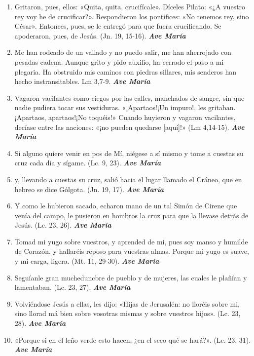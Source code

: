 \documentclass[a4paper,11pt, oneside]{report}
\begin{document}
\begin{enumerate}
  
  \item Gritaron, pues, ellos: «Quita, quita, crucifícale». Díceles Pilato: «¿A vuestro rey voy he de crucificar?». Respondieron los pontífices: «No tenemos rey,
  sino César». Entonces, pues, se le entregó para que fuera crucificando. Se apoderaron, pues, de Jesús. (Jn. 19, 15-16). \textbf{\textit{Ave María}}

  \item Me han rodeado de un vallado y no puedo salir, me han aherrojado con pesadas cadena. Aunque grito y pido auxilio, ha cerrado el paso
  a mi plegaria. Ha obstruido mis caminos con piedras sillares, mis senderos han hecho instransitables. Lm 3,7-9. \textbf{\textit{Ave María}}

  \item Vagaron vacilantes como ciegos por las calles, manchados de sangre, sin que nadie pudiera tocar sus vestiduras. «¡Apartaos!¡Un impuro!,
  les gritaban. ¡Apartaos, apartaos!¡No toquéis!» Cuando huyieron y vagaron vacilantes, decíase entre las naciones: «¡no pueden quedarse [aquí]!» 
  (Lm 4,14-15). \textbf{\textit{Ave María}}

  \item Si alguno quiere venir en pos de Mí, niégese a sí mismo y tome a cuestas su cruz cada día y sígame. (Lc. 9, 23). \textbf{\textit{Ave María}}

  \item y, llevando a cuestas su cruz, salió hacia el lugar llamado el Cráneo, que en hebreo se dice Gólgota. (Jn. 19, 17). \textbf{\textit{Ave María}}

  \item Y como le hubieron sacado, echaron mano de un tal Simón de Cirene que venía del campo, le pusieron en hombros la cruz para que la llevase
  detrás de Jesús. (Lc. 23, 26). \textbf{\textit{Ave María}}

  \item Tomad mi yugo sobre vuestros, y aprended de mi, pues soy manso y humilde de Corazón, y hallaréis reposo para vuestras almas.
  Porque mi yugo es suave, y mi carga, ligera. (Mt. 11, 29-30). \textbf{\textit{Ave María}}

  \item Seguíanle gran mucheduncbre de pueblo y de mujeres, las cuales le plañían y lamentaban. (Lc. 23, 27). \textbf{\textit{Ave María}}

  \item Volviéndose Jesús a ellas, les dijo: «Hijas de Jerusalén: no lloréis sobre mi, sino llorad má bien sobre vosotras mismas y sobre
  vuestros hijos». (Lc. 23, 28). \textbf{\textit{Ave María}}

  \item «Porque si en el leño verde esto hacen, ¿en el seco qué se hará?». (Lc. 23, 31). \textbf{\textit{Ave María}} 

\end{enumerate}
\end{document}
